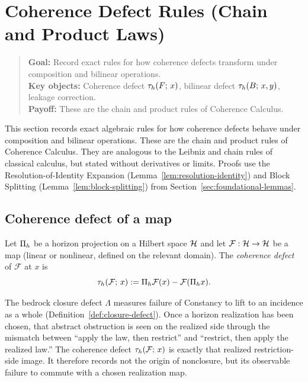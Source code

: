 \section{Coherence Defect Rules (Chain and Product Laws)}
\label{sec:defect-rules}

\begin{quote}\small
\textbf{Goal:} Record exact rules for how coherence defects transform under composition and bilinear operations.\\
\textbf{Key objects:} Coherence defect $\tau_{h}(F;\, x)$, bilinear defect $\tau_{h}(B;\, x, y)$, leakage correction.\\
\textbf{Payoff:} These are the chain and product rules of Coherence Calculus.
\end{quote}

This section records exact algebraic rules for how coherence defects behave under composition and bilinear operations.
These are the chain and product rules of Coherence Calculus. They are
analogous to the Leibniz and chain rules of classical calculus, but stated
without derivatives or limits.
Proofs use the Resolution-of-Identity Expansion (Lemma~\ref{lem:resolution-identity}) and Block Splitting (Lemma~\ref{lem:block-splitting}) from Section~\ref{sec:foundational-lemmas}.

\subsection{Coherence defect of a map}

\begin{definition}
\label{def:coherence-defect}
Let $\Pi_{h}$ be a horizon projection on a Hilbert space $\mathcal{H}$ and let $\mathcal{F}:\mathcal{H} \to \mathcal{H}$ be a map (linear or nonlinear, defined on the relevant domain).
The \emph{coherence defect} of $\mathcal{F}$ at $x$ is
\[
\tau_{h}(\mathcal{F};\, x) := \Pi_{h} \mathcal{F}(x) - \mathcal{F}(\Pi_{h} x).
\]
\end{definition}

\begin{remark}
\label{rem:coherence-defect-realized-closure-defect}
The bedrock closure defect \(\Lambda\) measures failure of Constancy to lift to
an incidence as a whole
(Definition~\ref{def:closure-defect}). Once a horizon realization has been
chosen, that abstract obstruction is seen on the realized side through the
mismatch between ``apply the law, then restrict'' and ``restrict, then apply
the realized law.'' The coherence defect \(\tau_{h}(\mathcal F;\, x)\) is
exactly that realized restriction-side image. It therefore records not the
origin of nonclosure, but its observable failure to commute with a chosen
realization map.
\end{remark}

